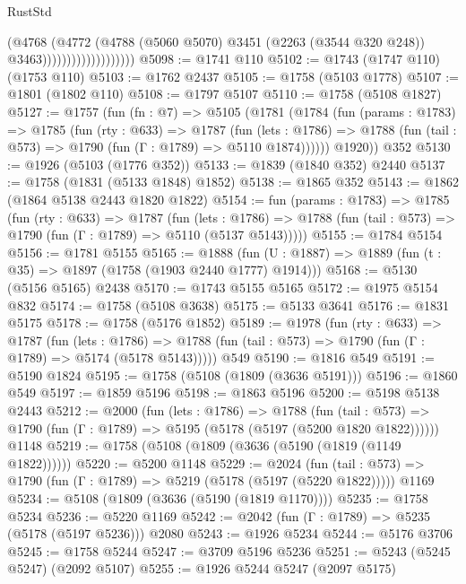 \begin{lexlean}{RustStd}
\begin{coremodule}
                                    (@4768
                                      (@4772
                                        (@4788
                                          (@5060 @5070)
                                          @3451
                                          (@2263 (@3544 @320 @248))
                                          @3463)))))))))))))))))))
@5098 := @1741 @110
@5102 := @1743 (@1747 @110) (@1753 @110)
@5103 := @1762 @2437
@5105 := @1758 (@5103 @1778)
@5107 := @1801 (@1802 @110)
@5108 := @1797 @5107
@5110 := @1758 (@5108 @1827)
@5127 := @1757
    (fun (fn : @7) =>
    @5105
      (@1781
        (@1784
          (fun (params : @1783) =>
          @1785
            (fun (rty : @633) =>
            @1787
              (fun (lets : @1786) =>
              @1788 (fun (tail : @573) => @1790 (fun (Γ : @1789) => @5110 @1874))))))
        @1920))
    @352
@5130 := @1926 (@5103 (@1776 @352))
@5133 := @1839 (@1840 @352) @2440
@5137 := @1758 (@1831 (@5133 @1848) @1852)
@5138 := @1865 @352
@5143 := @1862 (@1864 @5138 @2443 @1820 @1822)
@5154 := fun (params : @1783) =>
  @1785
    (fun (rty : @633) =>
    @1787
      (fun (lets : @1786) =>
      @1788 (fun (tail : @573) => @1790 (fun (Γ : @1789) => @5110 (@5137 @5143)))))
@5155 := @1784 @5154
@5156 := @1781 @5155
@5165 := @1888 (fun (U : @1887) => @1889 (fun (t : @35) => @1897 (@1758 (@1903 @2440 @1777) @1914)))
@5168 := @5130 (@5156 @5165) @2438
@5170 := @1743 @5155 @5165
@5172 := @1975 @5154 @832
@5174 := @1758 (@5108 @3638)
@5175 := @5133 @3641
@5176 := @1831 @5175
@5178 := @1758 (@5176 @1852)
@5189 := @1978
    (fun (rty : @633) =>
    @1787
      (fun (lets : @1786) =>
      @1788 (fun (tail : @573) => @1790 (fun (Γ : @1789) => @5174 (@5178 @5143)))))
    @549
@5190 := @1816 @549
@5191 := @5190 @1824
@5195 := @1758 (@5108 (@1809 (@3636 @5191)))
@5196 := @1860 @549
@5197 := @1859 @5196
@5198 := @1863 @5196
@5200 := @5198 @5138 @2443
@5212 := @2000
    (fun (lets : @1786) =>
    @1788
      (fun (tail : @573) => @1790 (fun (Γ : @1789) => @5195 (@5178 (@5197 (@5200 @1820 @1822))))))
    @1148
@5219 := @1758 (@5108 (@1809 (@3636 (@5190 (@1819 (@1149 @1822))))))
@5220 := @5200 @1148
@5229 := @2024
    (fun (tail : @573) => @1790 (fun (Γ : @1789) => @5219 (@5178 (@5197 (@5220 @1822)))))
    @1169
@5234 := @5108 (@1809 (@3636 (@5190 (@1819 @1170))))
@5235 := @1758 @5234
@5236 := @5220 @1169
@5242 := @2042 (fun (Γ : @1789) => @5235 (@5178 (@5197 @5236))) @2080
@5243 := @1926 @5234
@5244 := @5176 @3706
@5245 := @1758 @5244
@5247 := @3709 @5196 @5236
@5251 := @5243 (@5245 @5247) (@2092 @5107)
@5255 := @1926 @5244 @5247 (@2097 @5175)

\end{coremodule}
\end{lexlean}
